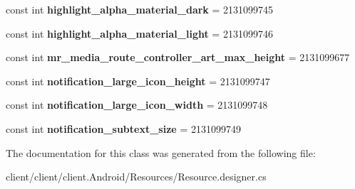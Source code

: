 \begin{DoxyCompactItemize}
\item 
\hypertarget{classClient_1_1Droid_1_1Resource_1_1Dimension_a509cb437eb8f703af13d1bcd7ffe664e}{}const int {\bfseries highlight\+\_\+alpha\+\_\+material\+\_\+dark} = 2131099745\label{classClient_1_1Droid_1_1Resource_1_1Dimension_a509cb437eb8f703af13d1bcd7ffe664e}

\item 
\hypertarget{classClient_1_1Droid_1_1Resource_1_1Dimension_a0801db074a4e2182b1eb3895e14f6a5b}{}const int {\bfseries highlight\+\_\+alpha\+\_\+material\+\_\+light} = 2131099746\label{classClient_1_1Droid_1_1Resource_1_1Dimension_a0801db074a4e2182b1eb3895e14f6a5b}

\item 
\hypertarget{classClient_1_1Droid_1_1Resource_1_1Dimension_adfa31e9316c312809110d7cba2b011d9}{}const int {\bfseries mr\+\_\+media\+\_\+route\+\_\+controller\+\_\+art\+\_\+max\+\_\+height} = 2131099677\label{classClient_1_1Droid_1_1Resource_1_1Dimension_adfa31e9316c312809110d7cba2b011d9}

\item 
\hypertarget{classClient_1_1Droid_1_1Resource_1_1Dimension_a49c953049f33afb954e82ba9fc41cfd4}{}const int {\bfseries notification\+\_\+large\+\_\+icon\+\_\+height} = 2131099747\label{classClient_1_1Droid_1_1Resource_1_1Dimension_a49c953049f33afb954e82ba9fc41cfd4}

\item 
\hypertarget{classClient_1_1Droid_1_1Resource_1_1Dimension_ab77898376cce841e3a979b30ef38daa2}{}const int {\bfseries notification\+\_\+large\+\_\+icon\+\_\+width} = 2131099748\label{classClient_1_1Droid_1_1Resource_1_1Dimension_ab77898376cce841e3a979b30ef38daa2}

\item 
\hypertarget{classClient_1_1Droid_1_1Resource_1_1Dimension_a023bcc79f01f1c4a55892327d78d69ce}{}const int {\bfseries notification\+\_\+subtext\+\_\+size} = 2131099749\label{classClient_1_1Droid_1_1Resource_1_1Dimension_a023bcc79f01f1c4a55892327d78d69ce}

\end{DoxyCompactItemize}


The documentation for this class was generated from the following file\+:\begin{DoxyCompactItemize}
\item 
client/client/client.\+Android/\+Resources/Resource.\+designer.\+cs\end{DoxyCompactItemize}
